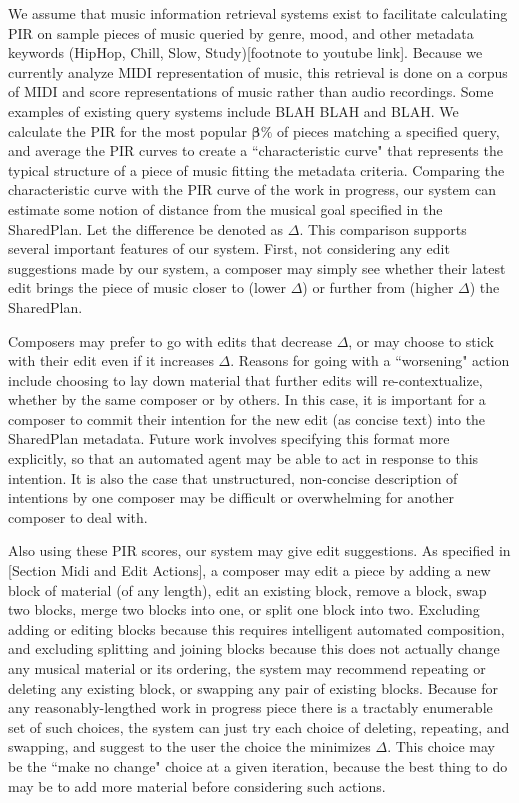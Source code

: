 \documentclass[final,authoryear,5p,times,twocolumn]{elsarticle}
\begin{document}
We assume that music information retrieval systems exist to facilitate calculating PIR on sample pieces of music queried by genre, mood, and other metadata keywords (HipHop, Chill, Slow, Study)[footnote to youtube link]. Because we currently analyze MIDI representation of music, this retrieval is done on a corpus of MIDI and score representations of music rather than audio recordings. Some examples of existing query systems include BLAH BLAH and BLAH. We calculate the PIR for the most popular $\boldsymbol{\beta}\%$ of pieces matching a specified query, and average the PIR curves to create a ``characteristic curve" that represents the typical structure of a piece of music fitting the metadata criteria. 
Comparing the characteristic curve with the PIR curve of the work in progress, our system can estimate some notion of distance from the musical goal specified in the SharedPlan. Let the difference be denoted as $\Delta$. This comparison supports several important features of our system. First, not considering any edit suggestions made by our system, a composer may simply see whether their latest edit brings the piece of music closer to (lower $\Delta$) or further from (higher $\Delta$) the SharedPlan.  

Composers may prefer to go with edits that decrease $\Delta$, or may choose to stick with their edit even if it increases $\Delta$. Reasons for going with a ``worsening" action include choosing to lay down material that further edits will re-contextualize, whether by the same composer or by others. In this case, it is important for a composer to commit their intention for the new edit (as concise text) into the SharedPlan metadata. Future work involves specifying this format more explicitly, so that an automated agent may be able to act in response to this intention. It is also the case that unstructured, non-concise description of intentions by one composer may be difficult or overwhelming for another composer to deal with.

Also using these PIR scores, our system may give edit suggestions. As specified in [Section Midi and Edit Actions], a composer may edit a piece by adding a new block of material (of any length), edit an existing block, remove a block, swap two blocks, merge two blocks into one, or split one block into two. Excluding adding or editing blocks because this requires intelligent automated composition, and excluding splitting and joining blocks because this does not actually change any musical material or its ordering, the system may recommend repeating or deleting any existing block, or swapping any pair of existing blocks. Because for any reasonably-lengthed work in progress piece there is a tractably enumerable set of such choices, the system can just try each choice of deleting, repeating, and swapping, and suggest to the user the choice the minimizes $\Delta$. This choice may be the ``make no change" choice at a given iteration, because the best thing to do may be to add more material before considering such actions.
\end{document}
